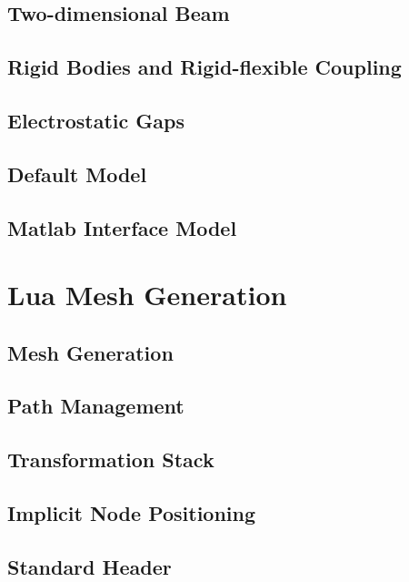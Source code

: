 \documentclass[10pt]{report}
\begin{document}
\chapter{Two-dimensional Beam}


\chapter{Rigid Bodies and Rigid-flexible Coupling}


\chapter{Electrostatic Gaps}


\chapter{Default Model}


\chapter{Matlab Interface Model}



\part{Lua Mesh Generation}

\chapter{Mesh Generation}


\chapter{Path Management}


\chapter{Transformation Stack}


\chapter{Implicit Node Positioning}


\chapter{Standard Header}

\end{document}
